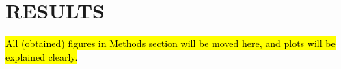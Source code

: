 \chapter{RESULTS}

\hl{All (obtained) figures in Methods section will be moved here, and plots will be explained clearly.}

